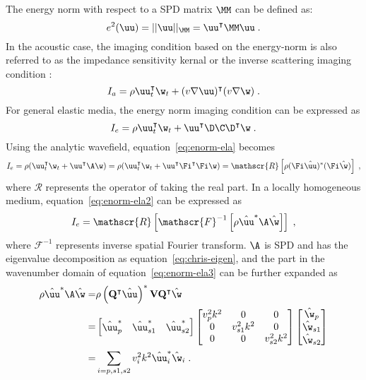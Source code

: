 The energy norm with respect to a SPD matrix $\MM$ can be defined as:
\begin{equation}
    \label{eq:e-norm}
    e^2(\uu) = ||\uu||_{\MM} = \uu^\intercal \MM \uu \;.
\end{equation}
In the acoustic case, the imaging condition based on the energy-norm is also referred to as the impedance sensitivity kernal \cite[]{zhu09} or the inverse scattering imaging condition \cite[]{whitmore12}:
\begin{equation}
    \label{eq:enorm-acu}
    I_a = \rho \uu_t^\intercal \w_t + (v \nabla \uu)^\intercal (v \nabla \w) \;.
\end{equation}
For general elastic media, the energy norm imaging condition can be expressed as \cite[]{kiyashchenko07,rocha16}
\begin{equation}
    \label{eq:enorm-ela}
    I_e = \rho \uu_t^\intercal \w_t + \uu^\intercal \D\C\D^\intercal \w \;.
\end{equation}
Using the analytic wavefield, equation~\ref{eq:enorm-ela} becomes
\begin{equation}
    \label{eq:enorm-ela2}
    I_e = \rho ( \uu_t^\intercal \w_t + \uu^\intercal \A \w ) = \rho ( \uu_t^\intercal \w_t + \uu^\intercal \Fi^\intercal \Fi \w ) = \mathscr{R}\left[ \rho (\Fi \hat{\uu})^*(\Fi \hat{\w}) \right] \;,
\end{equation}
where $\mathscr{R}$ represents the operator of taking the real part. In a locally homogeneous medium, equation~\ref{eq:enorm-ela2} can be expressed as
\begin{equation}
    \label{eq:enorm-ela3}
    I_e = \mathscr{R}\left[ \mathscr{F}^{-1} \left[ \rho \hat{\uu}^* \A \hat{\w} \right] \right] \;,
\end{equation}
where $\mathscr{F}^{-1}$ represents inverse spatial Fourier transform. $\A$ is SPD and has the eigenvalue decomposition as equation~\ref{eq:chris-eigen}, and the part in the wavenumber domain of equation~\ref{eq:enorm-ela3} can be further expanded as
\begin{eqnarray}
    \label{eq:decom-ic}
    \nonumber
    \rho \hat{\uu}^* \A \hat{\w} =& \rho  \left( \mathbf{Q}^\intercal \hat{\uu} \right)^* \mathbf{V} \mathbf{Q}^\intercal \hat{\w} \\ \nonumber
                                =& \begin{bmatrix} \hat{\uu}_p^* & \hat{\uu}_{s1}^* & \hat{\uu}_{s2}^*\end{bmatrix} \begin{bmatrix} v_p^2 k^2 & 0 & 0 \\ 0 & v_{s1}^2 k^2 & 0 \\ 0 & 0 & v_{s2}^2 k^2 \end{bmatrix} \begin{bmatrix} \hat{\w}_p \\ \hat{\w}_{s1} \\ \hat{\w}_{s2} \end{bmatrix} \\
                                =& \sum\limits_{i=p,s1,s2} v_i^2 k^2 \hat{\uu}_i^* \hat{\w}_i \;.
\end{eqnarray}

